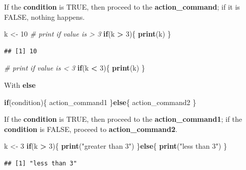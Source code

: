 \documentclass[]{book}
\newenvironment{Shaded}{\begin{snugshade}}{\end{snugshade}}
\newcommand{\CommentTok}[1]{\textcolor[rgb]{0.56,0.35,0.01}{\textit{#1}}}
\newcommand{\ControlFlowTok}[1]{\textcolor[rgb]{0.13,0.29,0.53}{\textbf{#1}}}
\newcommand{\DecValTok}[1]{\textcolor[rgb]{0.00,0.00,0.81}{#1}}
\newcommand{\KeywordTok}[1]{\textcolor[rgb]{0.13,0.29,0.53}{\textbf{#1}}}
\newcommand{\NormalTok}[1]{#1}
\newcommand{\OperatorTok}[1]{\textcolor[rgb]{0.81,0.36,0.00}{\textbf{#1}}}
\newcommand{\StringTok}[1]{\textcolor[rgb]{0.31,0.60,0.02}{#1}}
\begin{document}
If the \textbf{condition} is TRUE, then proceed to the \textbf{action\_command}; if it is FALSE, nothing happens.

\begin{Shaded}
\begin{Highlighting}[]
\NormalTok{k <-}\StringTok{ }\DecValTok{10}
\CommentTok{# print if value is > 3}
\ControlFlowTok{if}\NormalTok{(k }\OperatorTok{>}\StringTok{ }\DecValTok{3}\NormalTok{)\{}
  \KeywordTok{print}\NormalTok{(k)}
\NormalTok{\}}
\end{Highlighting}
\end{Shaded}

\begin{verbatim}
## [1] 10
\end{verbatim}

\begin{Shaded}
\begin{Highlighting}[]
\CommentTok{# print if value is < 3}
\ControlFlowTok{if}\NormalTok{(k }\OperatorTok{<}\StringTok{ }\DecValTok{3}\NormalTok{)\{}
  \KeywordTok{print}\NormalTok{(k)}
\NormalTok{\}}
\end{Highlighting}
\end{Shaded}

With \textbf{else}

\begin{Shaded}
\begin{Highlighting}[]
\ControlFlowTok{if}\NormalTok{(condition)\{}
\NormalTok{    action_command1}
\NormalTok{\}}\ControlFlowTok{else}\NormalTok{\{}
\NormalTok{    action_command2}
\NormalTok{\}}
\end{Highlighting}
\end{Shaded}

If the \textbf{condition} is TRUE, then proceed to the \textbf{action\_command1}; if the \textbf{condition} is FALSE, proceed to \textbf{action\_command2}.

\begin{Shaded}
\begin{Highlighting}[]
\NormalTok{k <-}\StringTok{ }\DecValTok{3}
\ControlFlowTok{if}\NormalTok{(k }\OperatorTok{>}\StringTok{ }\DecValTok{3}\NormalTok{)\{}
  \KeywordTok{print}\NormalTok{(}\StringTok{"greater than 3"}\NormalTok{)}
\NormalTok{\}}\ControlFlowTok{else}\NormalTok{\{}
  \KeywordTok{print}\NormalTok{(}\StringTok{"less than 3"}\NormalTok{)}
\NormalTok{\}}
\end{Highlighting}
\end{Shaded}

\begin{verbatim}
## [1] "less than 3"
\end{verbatim}
\end{document}
